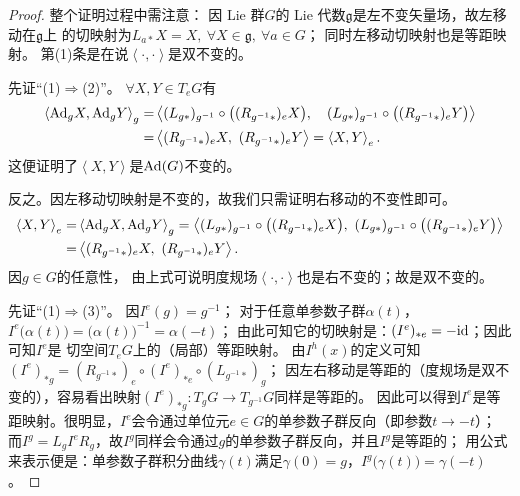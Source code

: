 \begin{proof}
    整个证明过程中需注意：
    因 Lie 群$G$的 Lie 代数$\mathfrak{g}$是左不变矢量场，故左移动在$\mathfrak{g}$上
    的切映射为$L_{a*} X = X,\  \forall X\in \mathfrak{g},\ \forall a\in G$；
    同时左移动切映射也是等距映射。
    第(1)条是在说$\left<\cdot,\cdot\right>$是双不变的。
    
    先证“(1)$\Rightarrow$(2)”。    $\forall X,Y \in T_e G$有
    \begin{align*}
        \left<{\rm Ad}_{g} X, {\rm Ad}_{g} Y\right>_{g} =& 
        \left<(L_{g*})_{g^{-1}} \circ \bigl((R_{g^{-1}*})_{e} X\bigr) ,\quad 
        (L_{g*})_{g^{-1}} \circ \bigl((R_{g^{-1}*})_{e} Y\bigr)\right> \\
        =& \left<(R_{g^{-1}*})_{e} X,\ (R_{g^{-1}*})_{e} Y \right>
        =\left<X,Y\right>_e .
    \end{align*}
    这便证明了$\left<X,Y\right>$是${\rm Ad}(G)$不变的。
    
    反之。因左移动切映射是不变的，故我们只需证明右移动的不变性即可。
    \begin{align*}
        \left<X,Y\right>_e =& \left<{\rm Ad}_{g} X, {\rm Ad}_{g} Y\right>_{g} 
        =   \left<(L_{g*})_{g^{-1}} \circ \bigl((R_{g^{-1}*})_{e} X\bigr) ,\ 
        (L_{g*})_{g^{-1}} \circ \bigl((R_{g^{-1}*})_{e} Y\bigr)\right> \\
        =&\left<(R_{g^{-1}*})_{e} X,\ (R_{g^{-1}*})_{e} Y \right> .
    \end{align*}
    因$g\in G$的任意性，
    由上式可说明度规场$\left<\cdot,\cdot\right>$也是右不变的；故是双不变的。
    
    
    
    先证“(1)$\Rightarrow$(3)”。
    因$I^e(g)=g^{-1}$；    对于任意单参数子群$\alpha(t)$，
    $I^e\bigl(\alpha(t)\bigr) = \bigl(\alpha(t)\bigr)^{-1}=\alpha(-t)$；
    由此可知它的切映射是：$(I^e)_{*e}=-{\rm id}$；因此可知$I^e$是
    切空间$T_e G$上的（局部）等距映射。
    由$I^h(x)$的定义可知$(I^e)_{*g}= (R_{g^{-1}*})_e \circ (I^e)_{*e}\circ (L_{g^{-1}*})_g$；
    因左右移动是等距的（度规场是双不变的），容易看出映射$(I^e)_{*g}: T_g G \to T_{g^{-1}}G$同样是等距的。
    因此可以得到$I^e$是等距映射。很明显，$I^e$会令通过单位元$e\in G$的单参数子群反向（即参数$t\to -t$）；
    而$I^g=L_g I^e R_g$，故$I^g$同样会令通过$g$的单参数子群反向，并且$I^g$是等距的；
    用公式来表示便是：单参数子群积分曲线$\gamma(t)$满足$\gamma(0)=g$，$I^g\bigl(\gamma(t)\bigr) = \gamma(-t)$。
    

\end{proof}

